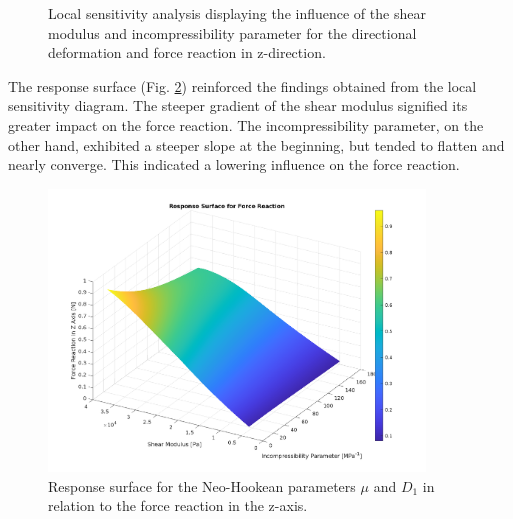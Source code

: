 \begin{figure}%
    \centering
	\caption[Local sensitivity analysis - Initial parameter range]{Local sensitivity analysis displaying the influence of the shear modulus and incompressibility parameter for the directional deformation and force reaction in z-direction.}%
	\label{fig:fullrangelocalsensi}%
 \end{figure}

The response surface (Fig. \ref{fig:rsoforce}) 
reinforced the findings obtained from the local sensitivity diagram. The steeper gradient of the shear modulus 
signified its greater impact on the force reaction. The incompressibility parameter, on the other hand, 
exhibited a steeper slope at the beginning, but tended to flatten and nearly converge. This indicated 
a lowering influence on the force reaction.

\begin{figure}%
	\centering
   \quad
   \includegraphics[width=10cm]{Images/ifem/plat NH 4 and 2 fullrange/rsoforce1.png}%
   \caption[Response surface - Force reaction]{Response surface for the Neo-Hookean parameters $\mu$ and $D_1$ in relation to the force reaction in the z-axis.}%
   \label{fig:rsoforce}%
\end{figure}

